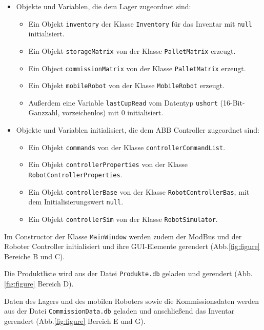     \begin{itemize}
        \item Objekte und Variablen, die dem Lager zugeordnet sind:
            \begin{itemize}
                \item Ein Objekt \verb|inventory| der Klasse \verb|Inventory| für das Inventar mit \verb|null| initialisiert.
                \item Ein Objekt \verb|storageMatrix| von der Klasse \verb|PalletMatrix| erzeugt.
                \item Ein Object \verb|commissionMatrix| von der Klasse \verb|PalletMatrix| erzeugt.
                \item Ein Objekt \verb|mobileRobot| von der Klasse \verb |MobileRobot| erzeugt.
                \item Außerdem eine Variable \verb|lastCupRead| vom Datentyp \verb|ushort| (16-Bit-Ganzzahl, vorzeichenlos) mit 0 initialisiert.
            \end{itemize}
            \item Objekte und Variablen initialisiert, die dem ABB Controller zugeordnet sind:
            \begin{itemize}
                \item Ein Objekt \verb|commands| von der Klasse \verb|controllerCommandList|.
                \item Ein Objekt \verb|controllerProperties| von der Klasse \verb|RobotControllerProperties|.
                \item Ein Objekt \verb|controllerBase| von der Klasse \verb|RobotControllerBas|, mit dem Initialisierungswert \verb|null|.
                \item Ein Objekt \verb|controllerSim| von der Klasse \verb|RobotSimulator|.
            \end{itemize}
    \end{itemize}

    Im Constructor der Klasse \verb|MainWindow| werden zudem der ModBus und der Roboter Controller initialisiert
    und ihre GUI-Elemente gerendert (Abb.\ref{fig:figure} Bereiche \glqq B\grqq{} und \glqq C\grqq).
    
    Die Produktliste wird aus der Datei \verb|Produkte.db| geladen und gerendert (Abb.\ref{fig:figure} Bereich \glqq D\grqq).
    
    Daten des Lagers und des mobilen Roboters sowie die Kommissionsdaten werden aus der Datei \verb|CommissionData.db|
    geladen und anschließend das Inventar gerendert (Abb.\ref{fig:figure} Bereich \glqq E\grqq{}  und \glqq G\grqq).
    
